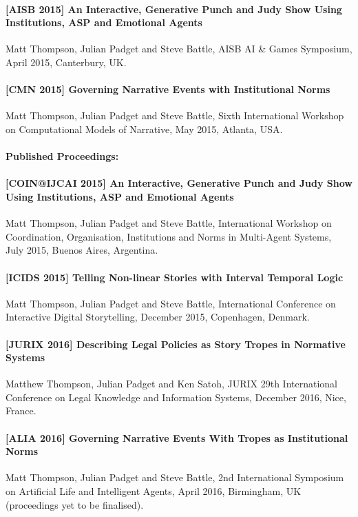\documentclass[11pt]{report}
\begin{document}
  \paragraph{[AISB 2015] An Interactive, Generative Punch and Judy Show Using Institutions, ASP and Emotional Agents} Matt Thompson, Julian Padget and Steve Battle, AISB AI \& Games Symposium, April 2015, Canterbury, UK.\label{pub:aisb}
  \paragraph{[CMN 2015] Governing Narrative Events with Institutional Norms} Matt Thompson, Julian Padget and Steve Battle, Sixth International Workshop on Computational Models of Narrative, May 2015, Atlanta, USA.\label{pub:cmn}
  \paragraph{Published Proceedings:}
  \paragraph{[COIN@IJCAI 2015] An Interactive, Generative Punch and Judy Show Using Institutions, ASP and Emotional Agents} Matt Thompson, Julian Padget and Steve Battle, International Workshop on Coordination, Organisation, Institutions and Norms in Multi-Agent Systems, July 2015, Buenos Aires, Argentina.\label{pub:coin}~\citep{thompson2015interactive}
  \paragraph{[ICIDS 2015] Telling Non-linear Stories with Interval Temporal Logic} Matt
  Thompson, Julian Padget and Steve Battle, International Conference on
  Interactive Digital Storytelling, December 2015, Copenhagen, Denmark.\label{pub:icids}~\citep{thompson2015telling}
  \paragraph{[JURIX 2016] Describing Legal Policies as Story Tropes in Normative
    Systems} Matthew Thompson, Julian Padget and Ken Satoh, JURIX 29th
  International Conference on Legal Knowledge and Information Systems, December
  2016, Nice, France.\label{pub:jurix}~\citep{thompson2016describing}
  \paragraph{[ALIA 2016] Governing Narrative Events With Tropes as Institutional
    Norms} Matt Thompson, Julian Padget and Steve Battle, 2nd International
  Symposium on Artificial Life and Intelligent Agents, April 2016, Birmingham,
  UK (proceedings yet to be finalised).\label{pub:alia}
\end{document}
